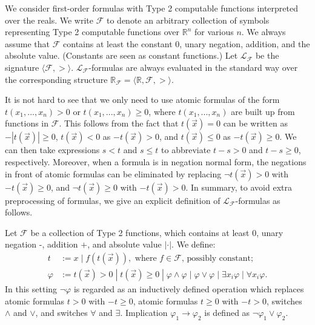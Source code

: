 \documentclass[envcountsect]{llncs}
\begin{document}
We consider first-order formulas with Type 2 computable functions interpreted 
over the reals. We write $\mathcal{F}$ to denote an arbitrary collection of
symbols representing Type 2 computable functions over $\mathbb{R}^n$ for various
$n$. We always assume that $\mathcal{F}$ contains at least the constant $0$,
unary negation, addition, and the absolute value. (Constants are seen as
constant functions.) Let $\mathcal{L_{\mathcal{F}}}$ be the signature $\langle
\mathcal{F}, >\rangle$. $\mathcal{L}_{\mathcal{F}}$-formulas are always
evaluated in the standard way over the corresponding structure
$\mathbb{R}_{\mathcal{F}}= \langle \mathbb{R}, \mathcal{F}, >\rangle$.  

It is not hard to see that we only need to use atomic formulas of the form 
$t(x_1,...,x_n)>0$ or $t(x_1,...,x_n)\geq 0$, where $t(x_1,...,x_n)$ are built
up from functions in $\mathcal{F}$. This follows from the fact that $t(\vec
x)=0$ can be written as $-|t(\vec x)|\geq 0$, $t(\vec x)<0$ as $-t(\vec x)>0$,
and $t(\vec x)\leq 0$ as $-t(\vec x)\geq 0$. We can then take expressions $s <t
$ and $s \leq t$ to abbreviate $t - s > 0$ and $t - s \geq 0$, respectively.
Moreover, when a formula is in negation normal form, the negations in front of
atomic formulas can be eliminated by replacing $\neg t(\vec x) > 0$ with
$-t(\vec x)\geq 0$, and $\neg t(\vec x)\geq 0$ with $-t(\vec x)>0$. In summary,
to avoid extra preprocessing of formulas, we give an explicit definition of
$\mathcal{L}_{\mathcal{F}}$-formulas as follows.

\begin{definition}
Let $\mathcal{F}$ be a collection of Type 2 functions, which contains at least 
$0$, unary negation -, addition $+$, and absolute value $|\cdot|$. We define:
\begin{align*}
t& := x \; | \; f(t(\vec x)), \mbox{ where }f\in \mathcal{F}\mbox{, possibly 
constant};\\
\varphi& := t(\vec x)> 0 \; | \; t(\vec x)\geq 0 \; | \; \varphi\wedge\varphi 
\; | \; \varphi\vee\varphi \; | \; \exists x_i\varphi \; |\; \forall x_i\varphi.
\end{align*}
In this setting $\neg\varphi$ is regarded as an inductively defined operation 
which replaces atomic formulas $t>0$ with $-t\geq 0$, atomic formulas $t\geq 0$
with $-t>0$, switches $\wedge$ and $\vee$, and switches $\forall$ and $\exists$.
Implication $\varphi_1\rightarrow\varphi_2$ is defined as
$\neg\varphi_1\vee\varphi_2$.
\end{definition}
\end{document}

